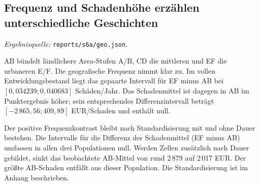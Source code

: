 \documentclass[11pt,a4paper]{article}
\newcommand{\evidence}[1]{\par{\footnotesize\textit{Ergebnisquelle:} \nolinkurl{#1}.}\par}
\begin{document}
\subsection*{Frequenz und Schadenhöhe erzählen unterschiedliche Geschichten}
\begin{center}\small\GeoTable\end{center}
\evidence{reports/s6a/geo.json}
AB bündelt ländlichere Area-Stufen A/B, CD die mittleren und EF die urbaneren E/F. Die geografische Frequenz nimmt klar zu. Im vollen Entwicklungsbestand liegt das gepaarte Intervall für EF minus AB bei $[0{,}034239;0{,}040683]$ Schäden/Jahr. Das Schadenmittel ist dagegen in AB im Punktergebnis höher; sein entsprechendes Differenzintervall beträgt $[-2\,865{,}56;409{,}89]$ EUR/Schaden und enthält null.

Der positive Frequenzkontrast bleibt nach Standardisierung mit und ohne Dauer bestehen. Die Intervalle für die Differenz der Schadenmittel (EF minus AB) umfassen in allen drei Populationen null. Werden Zellen zusätzlich nach Dauer gebildet, sinkt das beobachtete AB-Mittel von rund 2\,879 auf 2\,017 EUR. Der größte AB-Schaden entfällt aus dieser Population. Die Standardisierung ist im Anhang beschrieben.

\clearpage
\end{document}
